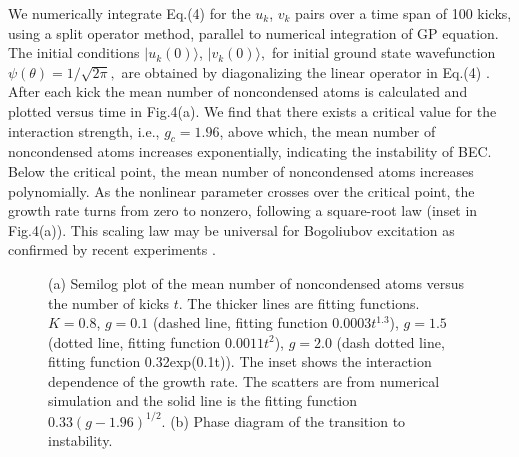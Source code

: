 \documentclass[twocolumn,prl,aps,showpacs]{revtex4}
\begin{document}
We numerically integrate Eq.(4) for the $u_k$, $v_k$ pairs over a 
time
span of 100 kicks, using a split operator method, parallel to numerical
integration of GP equation. The initial
conditions $|u_k(0)\rangle $, $|v_k(0)\rangle ,$ for initial ground state
wavefunction $\psi (\theta )=1/\sqrt{2\pi },$ are obtained by 
diagonalizing the linear operator in Eq.(4) \cite{castin2}. After each 
kick
the mean number of noncondensed atoms is calculated and plotted 
versus time in Fig.4(a).
We find that there exists a critical value for the interaction strength, i.e.,
$g_c=1.96$, above which, the mean number of noncondensed atoms increases
exponentially, indicating the instability of BEC. Below the critical point,
the mean number of noncondensed atoms increases polynomially.  
As the nonlinear
parameter crosses over the
critical point,             
the growth rate
turns from zero to nonzero,
following   a square-root 
law (inset in Fig.4(a)).
This scaling law may be   universal for Bogoliubov 
excitation as  confirmed by recent  experiments \cite{ketterle}. 
\begin{figure}[!t]
\vspace*{-0.5cm}
\begin{center}
\end{center}
\vspace*{-1.0cm}

\caption{(a) Semilog plot of the mean number of noncondensed atoms versus the number of kicks $t$. 
The thicker lines are fitting functions. $K=0.8$, $g=0.1$ (dashed line, fitting
function $0.0003 t^{1.3} $), $g=1.5$ (dotted line, fitting function $%
0.0011t^2$), $g=2.0$ (dash dotted line, fitting function 0.32exp(0.1t)). 
The inset shows the interaction dependence of the growth rate. 
The scatters are from numerical simulation and the solid line is the fitting function $0.33{(g-1.96)}^{1/2}$.
(b) Phase diagram of the transition to instability.}
\label{fig:bog}
\end{figure}
\end{document}

